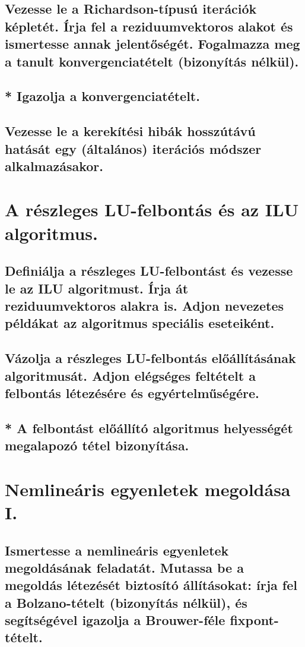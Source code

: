 \documentclass{article}
\begin{document}
        \subsection{Vezesse le a Richardson-típusú iterációk képletét. Írja fel a reziduumvektoros alakot és ismertesse annak jelentőségét. Fogalmazza meg a tanult konvergenciatételt (bizonyítás nélkül).}
        \subsection{* Igazolja a konvergenciatételt.}
        \subsection{Vezesse le a kerekítési hibák hosszútávú hatását egy (általános) iterációs módszer alkalmazásakor.}


    \section{A részleges LU-felbontás és az ILU algoritmus.}
        \subsection{Definiálja a részleges LU-felbontást és vezesse le az ILU algoritmust. Írja át reziduumvektoros alakra is. Adjon nevezetes példákat az algoritmus speciális eseteiként.}
        \subsection{Vázolja a részleges LU-felbontás előállításának algoritmusát. Adjon elégséges feltételt a felbontás létezésére és egyértelműségére.}
        \subsection{* A felbontást előállító algoritmus helyességét megalapozó tétel bizonyítása.}


    \section{Nemlineáris egyenletek megoldása I.}
        \subsection{Ismertesse a nemlineáris egyenletek megoldásának feladatát. Mutassa be a megoldás létezését biztosító állításokat: írja fel a Bolzano-tételt (bizonyítás nélkül), és segítségével igazolja a Brouwer-féle fixpont-tételt.}
\end{document}
